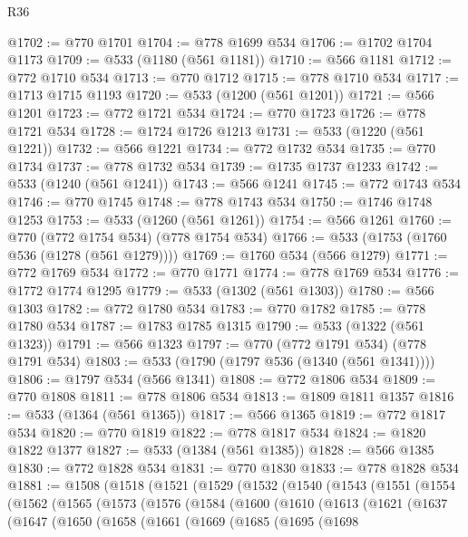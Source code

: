 \begin{lexlean}{R36}
\begin{coremodule}
@1702 := @770 @1701
@1704 := @778 @1699 @534
@1706 := @1702 @1704 @1173
@1709 := @533 (@1180 (@561 @1181))
@1710 := @566 @1181
@1712 := @772 @1710 @534
@1713 := @770 @1712
@1715 := @778 @1710 @534
@1717 := @1713 @1715 @1193
@1720 := @533 (@1200 (@561 @1201))
@1721 := @566 @1201
@1723 := @772 @1721 @534
@1724 := @770 @1723
@1726 := @778 @1721 @534
@1728 := @1724 @1726 @1213
@1731 := @533 (@1220 (@561 @1221))
@1732 := @566 @1221
@1734 := @772 @1732 @534
@1735 := @770 @1734
@1737 := @778 @1732 @534
@1739 := @1735 @1737 @1233
@1742 := @533 (@1240 (@561 @1241))
@1743 := @566 @1241
@1745 := @772 @1743 @534
@1746 := @770 @1745
@1748 := @778 @1743 @534
@1750 := @1746 @1748 @1253
@1753 := @533 (@1260 (@561 @1261))
@1754 := @566 @1261
@1760 := @770 (@772 @1754 @534) (@778 @1754 @534)
@1766 := @533 (@1753 (@1760 @536 (@1278 (@561 @1279))))
@1769 := @1760 @534 (@566 @1279)
@1771 := @772 @1769 @534
@1772 := @770 @1771
@1774 := @778 @1769 @534
@1776 := @1772 @1774 @1295
@1779 := @533 (@1302 (@561 @1303))
@1780 := @566 @1303
@1782 := @772 @1780 @534
@1783 := @770 @1782
@1785 := @778 @1780 @534
@1787 := @1783 @1785 @1315
@1790 := @533 (@1322 (@561 @1323))
@1791 := @566 @1323
@1797 := @770 (@772 @1791 @534) (@778 @1791 @534)
@1803 := @533 (@1790 (@1797 @536 (@1340 (@561 @1341))))
@1806 := @1797 @534 (@566 @1341)
@1808 := @772 @1806 @534
@1809 := @770 @1808
@1811 := @778 @1806 @534
@1813 := @1809 @1811 @1357
@1816 := @533 (@1364 (@561 @1365))
@1817 := @566 @1365
@1819 := @772 @1817 @534
@1820 := @770 @1819
@1822 := @778 @1817 @534
@1824 := @1820 @1822 @1377
@1827 := @533 (@1384 (@561 @1385))
@1828 := @566 @1385
@1830 := @772 @1828 @534
@1831 := @770 @1830
@1833 := @778 @1828 @534
@1881 := @1508
    (@1518
      (@1521
        (@1529
          (@1532
            (@1540
              (@1543
                (@1551
                  (@1554
                    (@1562
                      (@1565
                        (@1573
                          (@1576
                            (@1584
                              (@1600
                                (@1610
                                  (@1613
                                    (@1621
                                      (@1637
                                        (@1647
                                          (@1650
                                            (@1658
                                              (@1661
                                                (@1669
                                                  (@1685
                                                    (@1695
                                                      (@1698

\end{coremodule}
\end{lexlean}
